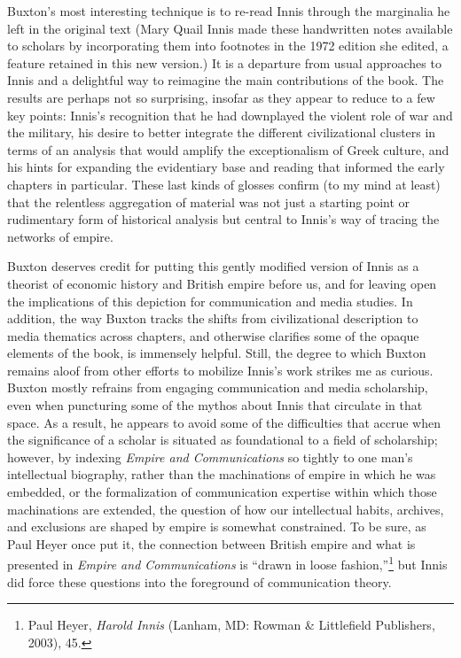 \documentclass{tufte-handout}
\begin{document}
Buxton's most interesting technique is to re-read Innis through the
marginalia he left in the original text (Mary Quail Innis made these
handwritten notes available to scholars by incorporating them into
footnotes in the 1972 edition she edited, a feature retained in this new
version.) It is a departure from usual approaches to Innis and a
delightful way to reimagine the main contributions of the book. The
results are perhaps not so surprising, insofar as they appear to reduce
to a few key points: Innis's recognition that he had downplayed the
violent role of war and the military, his desire to better integrate the
different civilizational clusters in terms of an analysis that would
amplify the exceptionalism of Greek culture, and his hints for expanding
the evidentiary base and reading that informed the early chapters in
particular. These last kinds of glosses confirm (to my mind at least)
that the relentless aggregation of material was not just a starting
point or rudimentary form of historical analysis but central to Innis's
way of tracing the networks of empire.

Buxton deserves credit for putting this gently modified version of Innis
as a theorist of economic history and British empire before us, and for
leaving open the implications of this depiction for communication and
media studies. In addition, the way Buxton tracks the shifts from
civilizational description to media thematics across chapters, and
otherwise clarifies some of the opaque elements of the book, is
immensely helpful. Still, the degree to which Buxton remains aloof from
other efforts to mobilize Innis's work strikes me as curious. Buxton
mostly refrains from engaging communication and media scholarship, even
when puncturing some of the mythos about Innis that circulate in that
space. As a result, he appears to avoid some of the difficulties that
accrue when the significance of a scholar is situated as foundational to
a field of scholarship; however, by indexing \emph{Empire and
Communications} so tightly to one man's intellectual biography, rather
than the machinations of empire in which he was embedded, or the
formalization of communication expertise within which those machinations
are extended, the question of how our intellectual habits, archives, and
exclusions are shaped by empire is somewhat constrained. To be sure, as
Paul Heyer once put it, the connection between British empire and what
is presented in \emph{Empire and Communications} is ``drawn in loose
fashion,''\footnote{Paul Heyer, \emph{Harold Innis} (Lanham, MD: Rowman
  \& Littlefield Publishers, 2003), 45.} but Innis did force these
questions into the foreground of communication theory.
\end{document}
